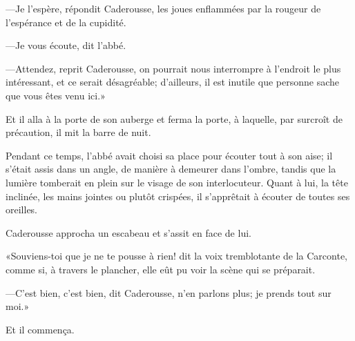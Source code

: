 —Je l'espère, répondit Caderousse, les joues enflammées par la rougeur de l'espérance et de la cupidité.

—Je vous écoute, dit l'abbé.

—Attendez, reprit Caderousse, on pourrait nous interrompre à l'endroit le plus intéressant, et ce serait désagréable; d'ailleurs, il est inutile que personne sache que vous êtes venu ici.»

Et il alla à la porte de son auberge et ferma la porte, à laquelle, par surcroît de précaution, il mit la barre de nuit.

Pendant ce temps, l'abbé avait choisi sa place pour écouter tout à son aise; il s'était assis dans un angle, de manière à demeurer dans l'ombre, tandis que la lumière tomberait en plein sur le visage de son interlocuteur. Quant à lui, la tête inclinée, les mains jointes ou plutôt crispées, il s'apprêtait à écouter de toutes ses oreilles.

Caderousse approcha un escabeau et s'assit en face de lui.

«Souviens-toi que je ne te pousse à rien! dit la voix tremblotante de la Carconte, comme si, à travers le plancher, elle eût pu voir la scène qui se préparait.

—C'est bien, c'est bien, dit Caderousse, n'en parlons plus; je prends tout sur moi.»

Et il commença.




